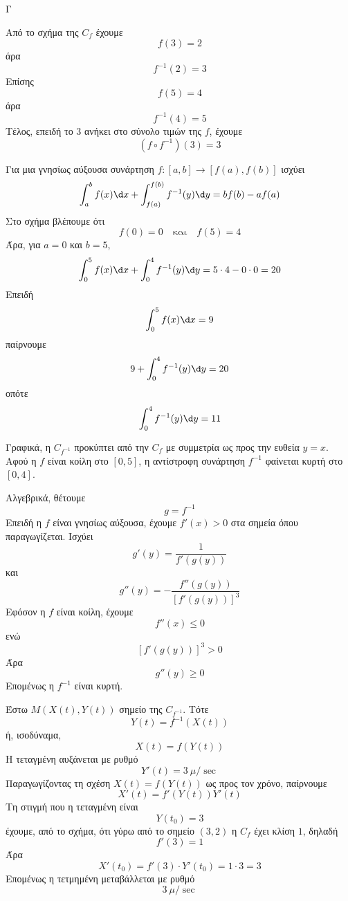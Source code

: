\begin{thema}{Γ}
\begin{erwthma}
\item Από το σχήμα της $C_f$ έχουμε
\[
f(3)=2
\]
άρα
\[
f^{-1}(2)=3
\]
Επίσης
\[
f(5)=4
\]
άρα
\[
f^{-1}(4)=5
\]
Τέλος, επειδή το $3$ ανήκει στο σύνολο τιμών της $f$, έχουμε
\[
(f\circ f^{-1})(3)=3
\]

\item Για μια γνησίως αύξουσα συνάρτηση $f:[a,b]\to[f(a),f(b)]$ ισχύει
\[
\dint_a^b f(x)\d x+\dint_{f(a)}^{f(b)} f^{-1}(y)\d y=bf(b)-af(a)
\]
Στο σχήμα βλέπουμε ότι
\[
f(0)=0
\quad \text{και}\quad
f(5)=4
\]
Άρα, για $a=0$ και $b=5$,
\[
\dint_0^5 f(x)\d x+\dint_0^4 f^{-1}(y)\d y=5\cdot 4-0\cdot 0=20
\]
Επειδή
\[
\dint_0^5 f(x)\d x=9
\]
παίρνουμε
\[
9+\dint_0^4 f^{-1}(y)\d y=20
\]
οπότε
\[
\dint_0^4 f^{-1}(y)\d y=11
\]

\item Γραφικά, η $C_{f^{-1}}$ προκύπτει από την $C_f$ με συμμετρία ως προς την ευθεία $y=x$.
Αφού η $f$ είναι κοίλη στο $[0,5]$, η αντίστροφη συνάρτηση $f^{-1}$ φαίνεται κυρτή στο $[0,4]$.

Αλγεβρικά, θέτουμε
\[
g=f^{-1}
\]
Επειδή η $f$ είναι γνησίως αύξουσα, έχουμε $f'(x)>0$ στα σημεία όπου παραγωγίζεται.
Ισχύει
\[
g'(y)=\frac{1}{f'(g(y))}
\]
και
\[
g''(y)=-\frac{f''(g(y))}{\left[f'(g(y))\right]^3}
\]
Εφόσον η $f$ είναι κοίλη, έχουμε
\[
f''(x)\leq 0
\]
ενώ
\[
\left[f'(g(y))\right]^3>0
\]
Άρα
\[
g''(y)\geq 0
\]
Επομένως η $f^{-1}$ είναι κυρτή.

\item Έστω $M(X(t),Y(t))$ σημείο της $C_{f^{-1}}$.
Τότε
\[
Y(t)=f^{-1}(X(t))
\]
ή, ισοδύναμα,
\[
X(t)=f(Y(t))
\]
Η τεταγμένη αυξάνεται με ρυθμό
\[
Y'(t)=3\ \mu/\sec
\]
Παραγωγίζοντας τη σχέση $X(t)=f(Y(t))$ ως προς τον χρόνο, παίρνουμε
\[
X'(t)=f'(Y(t))Y'(t)
\]
Τη στιγμή που η τεταγμένη είναι
\[
Y(t_0)=3
\]
έχουμε, από το σχήμα, ότι γύρω από το σημείο $(3,2)$ η $C_f$ έχει κλίση $1$, δηλαδή
\[
f'(3)=1
\]
Άρα
\[
X'(t_0)=f'(3)\cdot Y'(t_0)=1\cdot 3=3
\]
Επομένως η τετμημένη μεταβάλλεται με ρυθμό
\[
3\ \mu/\sec
\]
\end{erwthma}
\end{thema}


